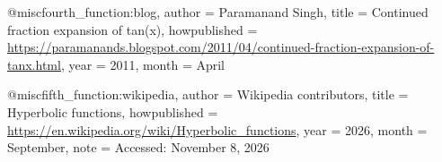 @misc{fourth_function:blog,
    author = {Paramanand Singh},
    title = {Continued fraction expansion of tan(x)},
    howpublished = {\url{https://paramanands.blogspot.com/2011/04/continued-fraction-expansion-of-tanx.html}},
    year = {2011},
    month = {April}
}

@misc{fifth_function:wikipedia,
    author = {Wikipedia contributors},
    title = {Hyperbolic functions},
    howpublished = {\url{https://en.wikipedia.org/wiki/Hyperbolic_functions}},
    year = {2026},
    month = {September},
    note = {Accessed: November 8, 2026}
}
